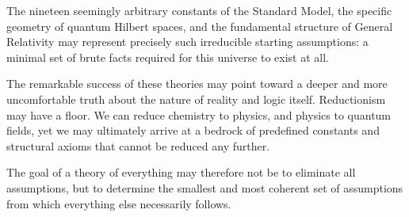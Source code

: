The nineteen seemingly arbitrary constants of the Standard Model, the specific geometry of quantum Hilbert spaces, and the fundamental structure of General Relativity may represent precisely such irreducible starting assumptions: a minimal set of brute facts required for this universe to exist at all.

The remarkable success of these theories may point toward a deeper and more uncomfortable truth about the nature of reality and logic itself.
Reductionism may have a floor. We can reduce chemistry to physics, and physics to quantum fields,
yet we may ultimately arrive at a bedrock of predefined constants and structural axioms that cannot be reduced any further.

The goal of a theory of everything may therefore not be to eliminate all assumptions,
but to determine the smallest and most coherent set of assumptions from which everything else necessarily follows.

